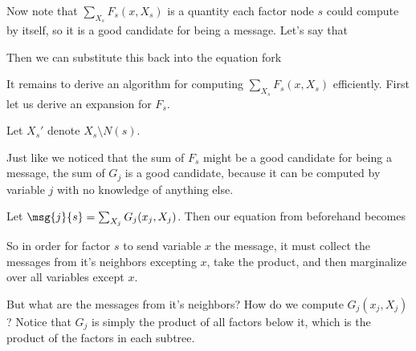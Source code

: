 \documentclass[12pt]{article}
\begin{document}
Now note that $\sum_{X_s} F_s(x, X_s)$ is a quantity each factor node $s$ could compute by itself, so it is a good candidate for being a message. Let's say that


Then we can substitute this back into the equation fork

It remains to derive an algorithm for computing $\sum_{X_s} F_s(x, X_s)$ efficiently. First let us derive an expansion for $F_s$.


Let $X_s'$ denote $X_s \setminus N(s)$. 


Just like we noticed that the sum of $F_s$ might be a good candidate for being a message, the sum of $G_j$ is a good candidate, because it can be computed by variable $j$ with no knowledge of anything else.

Let $\msg{j}{s} = \sum_{X_j} G_j(x_j, X_j)$. Then our equation from beforehand becomes


So in order for factor $s$ to send variable $x$ the message, it must collect the messages from it's neighbors excepting $x$, take the product, and then marginalize over all variables except $x$.

But what are the messages from it's neighbors? How do we compute $G_j(x_j, X_j)$? Notice that $G_j$ is simply the product of all factors below it, which is the product of the factors in each subtree.

\end{document}
